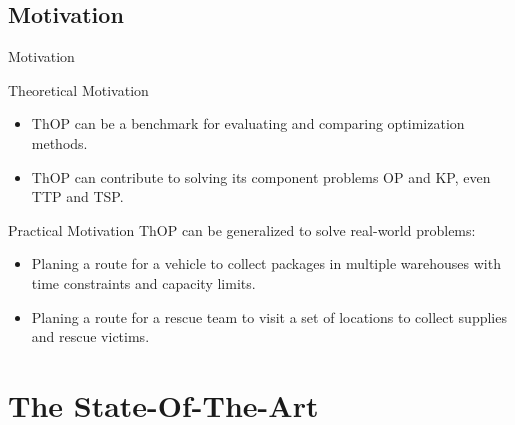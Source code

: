 \documentclass[aspectratio=169]{beamer}
\begin{document}
\subsection{Motivation}
\begin{frame}{Motivation}
    \begin{block}{Theoretical Motivation}
        \vspace{0.2cm}
        \begin{itemize}
            \item ThOP can be a benchmark for evaluating and comparing optimization methods.
            \item ThOP can contribute to solving its component problems OP and KP, even TTP and TSP.
        \end{itemize}
        \vspace{0.2cm}
    \end{block}
    \pause
    \begin{block}{Practical Motivation}
        \vspace{0.2cm}
        ThOP can be generalized to solve real-world problems:
        \begin{itemize}
            \item Planing a route for a vehicle to collect packages in multiple warehouses with time constraints and capacity limits.
            \item Planing a route for a rescue team to visit a set of locations to collect supplies and rescue victims.
        \end{itemize}
        \vspace{0.2cm}
    \end{block}
\end{frame}

\section{The State-Of-The-Art}
\end{document}
